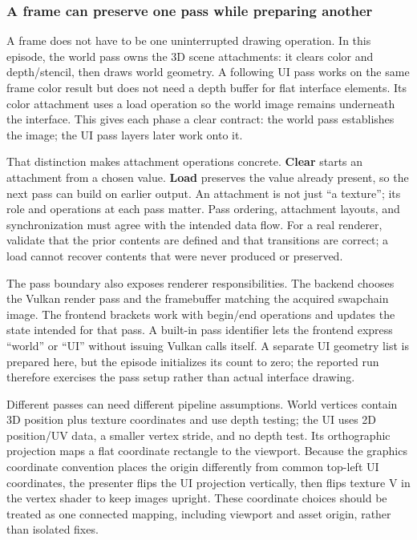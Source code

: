 \subsubsection{A frame can preserve one pass while preparing another}\label{06-engine-ii-ch026-a-frame-can-preserve-one-pass-while-preparing-another}

A frame does not have to be one uninterrupted drawing operation. In this episode, the world pass owns the 3D scene attachments: it clears color and depth/stencil, then draws world geometry. A following UI pass works on the same frame color result but does not need a depth buffer for flat interface elements. Its color attachment uses a load operation so the world image remains underneath the interface. This gives each phase a clear contract: the world pass establishes the image; the UI pass layers later work onto it.

That distinction makes attachment operations concrete. \textbf{Clear} starts an attachment from a chosen value. \textbf{Load} preserves the value already present, so the next pass can build on earlier output. An attachment is not just ``a texture''; its role and operations at each pass matter. Pass ordering, attachment layouts, and synchronization must agree with the intended data flow. For a real renderer, validate that the prior contents are defined and that transitions are correct; a load cannot recover contents that were never produced or preserved.

The pass boundary also exposes renderer responsibilities. The backend chooses the Vulkan render pass and the framebuffer matching the acquired swapchain image. The frontend brackets work with begin/end operations and updates the state intended for that pass. A built-in pass identifier lets the frontend express ``world'' or ``UI'' without issuing Vulkan calls itself. A separate UI geometry list is prepared here, but the episode initializes its count to zero; the reported run therefore exercises the pass setup rather than actual interface drawing.

Different passes can need different pipeline assumptions. World vertices contain 3D position plus texture coordinates and use depth testing; the UI uses 2D position/UV data, a smaller vertex stride, and no depth test. Its orthographic projection maps a flat coordinate rectangle to the viewport. Because the graphics coordinate convention places the origin differently from common top-left UI coordinates, the presenter flips the UI projection vertically, then flips texture V in the vertex shader to keep images upright. These coordinate choices should be treated as one connected mapping, including viewport and asset origin, rather than isolated fixes.


